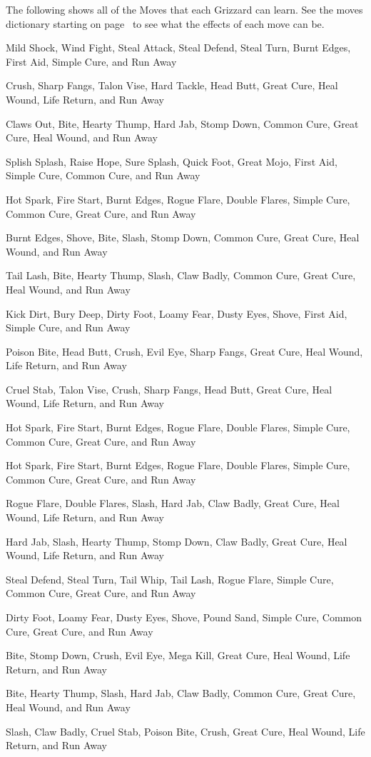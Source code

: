 \documentclass[10pt,twocolumn]{memoir}
\begin{document}
The following shows all of the Moves that each Grizzard can learn.
See the  moves dictionary  starting on  page~\pageref{sec:MovesTable} to
see what the effects of each move can be.

\begin{description}

\newcommand\grizzardmoves[9]{%
\item[#1]
#2, #3, #4, #5, #6, #7, #8, #9, and Run Away
}
\grizzardmoves{Airex}{Mild Shock}{Wind Fight}{Steal Attack}{Steal Defend}{Steal Turn}{Burnt Edges}{First Aid}{Simple Cure}
\grizzardmoves{Altrix}{Crush}{Sharp Fangs}{Talon Vise}{Hard Tackle}{Head Butt}{Great Cure}{Heal Wound}{Life Return}
\grizzardmoves{Ambren}{Claws Out}{Bite}{Hearty Thump}{Hard Jab}{Stomp Down}{Common Cure}{Great Cure}{Heal Wound}
\grizzardmoves{Aquax}{Splish Splash}{Raise Hope}{Sure Splash}{Quick Foot}{Great Mojo}{First Aid}{Simple Cure}{Common Cure}
\grizzardmoves{Burner}{Hot Spark}{Fire Start}{Burnt Edges}{Rogue Flare}{Double Flares}{Simple Cure}{Common Cure}{Great Cure}
\grizzardmoves{Corlyn}{Burnt Edges}{Shove}{Bite}{Slash}{Stomp Down}{Common Cure}{Great Cure}{Heal Wound}
\grizzardmoves{Cornet}{Tail Lash}{Bite}{Hearty Thump}{Slash}{Claw Badly}{Common Cure}{Great Cure}{Heal Wound}
\grizzardmoves{Dirtex}{Kick Dirt}{Bury Deep}{Dirty Foot}{Loamy Fear}{Dusty Eyes}{Shove}{First Aid}{Simple Cure}
\grizzardmoves{Dufont}{Poison Bite}{Head Butt}{Crush}{Evil Eye}{Sharp Fangs}{Great Cure}{Heal Wound}{Life Return}
\grizzardmoves{Ectrix}{Cruel Stab}{Talon Vise}{Crush}{Sharp Fangs}{Head Butt}{Great Cure}{Heal Wound}{Life Return}
\grizzardmoves{Firend}{Hot Spark}{Fire Start}{Burnt Edges}{Rogue Flare}{Double Flares}{Simple Cure}{Common Cure}{Great Cure}
\grizzardmoves{Flamex}{Hot Spark}{Fire Start}{Burnt Edges}{Rogue Flare}{Double Flares}{Simple Cure}{Common Cure}{Great Cure}
\grizzardmoves{Flarex}{Rogue Flare}{Double Flares}{Slash}{Hard Jab}{Claw Badly}{Great Cure}{Heal Wound}{Life Return}
\grizzardmoves{Flitex}{Hard Jab}{Slash}{Hearty Thump}{Stomp Down}{Claw Badly}{Great Cure}{Heal Wound}{Life Return}
\grizzardmoves{Flyer}{Steal Defend}{Steal Turn}{Tail Whip}{Tail Lash}{Rogue Flare}{Simple Cure}{Common Cure}{Great Cure}
\grizzardmoves{Lander}{Dirty Foot}{Loamy Fear}{Dusty Eyes}{Shove}{Pound Sand}{Simple Cure}{Common Cure}{Great Cure}
\grizzardmoves{Megax}{Bite}{Stomp Down}{Crush}{Evil Eye}{Mega Kill}{Great Cure}{Heal Wound}{Life Return}
\grizzardmoves{Noctis}{Bite}{Hearty Thump}{Slash}{Hard Jab}{Claw Badly}{Common Cure}{Great Cure}{Heal Wound}
\grizzardmoves{Oceax}{Slash}{Claw Badly}{Cruel Stab}{Poison Bite}{Crush}{Great Cure}{Heal Wound}{Life Return}

\end{description}
\end{document}
